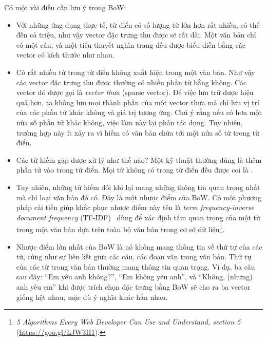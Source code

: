 Có một vài điều cần lưu ý trong BoW:
\begin{itemize}
\item Với những ứng dụng thực tế, {từ điển} có số lượng từ lớn hơn rất
nhiều, có thể đến cả triệu, như vậy vector đặc trưng thu được sẽ rất dài.
Một văn bản chỉ có một câu, và một tiểu thuyết nghìn trang đều được biểu
diễn bằng các vector có kích thước như nhau.

\item Có rất nhiều từ trong từ điển không xuất hiện trong một văn bản. Như
vậy các vector đặc trưng thu được thường có nhiều phần tử bằng không.
Các vector đó được gọi là \textit{vector thưa} (sparse vector). Để việc lưu trữ được hiệu quả hơn, ta không lưu mọi thành phần của một
vector thưa mà chỉ lưu {vị trí} của các phần tử khác không và {giá
trị} tương ứng. Chú ý rằng nếu có hơn một nửa số phần tử khác không, việc
làm này lại phản tác dụng. Tuy nhiên, trường hợp này ít xảy ra vì hiếm có
văn bản chứa tới một nửa số từ trong từ điển.

\item Các từ hiếm gặp được xử lý như thế nào? Một kỹ thuật thường dùng là
thêm phần tử  vào trong từ điển. Mọi từ không có
trong từ điển đều được coi là
.

\item Tuy nhiên, những từ hiếm đôi khi lại mang những thông tin quan
trọng nhất mà chỉ loại văn bản đó có. Đây là một nhược điểm của BoW. Có một
phương pháp cải tiến giúp khắc phục nhược điểm này tên là \textit{term
frequency-inverse document frequency} (TF-IDF)~\cite{salton1975vector} dùng
để xác định tầm quan trọng của một từ trong một văn bản dựa trên toàn bộ văn
bản trong cơ sở dữ liệu\footnote{\textit{5 Algorithms Every Web Developer
Can Use and Understand, section 5} (\url{https://goo.gl/LJW3H1}).}.

\item Nhược điểm lớn nhất của BoW là nó không mang thông tin về thứ tự của
các từ, cũng như sự liên kết giữa các câu, các đoạn văn trong văn bản. Thứ
tự của các từ trong văn bản thường mang thông tin quan trọng. Ví dụ, ba câu
sau đây: ``Em yêu anh không?'', ``Em không yêu anh'', và ``Không, (nhưng)
anh yêu em'' khi được trích chọn đặc trưng bằng BoW sẽ cho ra ba vector
giống hệt nhau, mặc dù ý nghĩa khác hẳn nhau.
\end{itemize}



